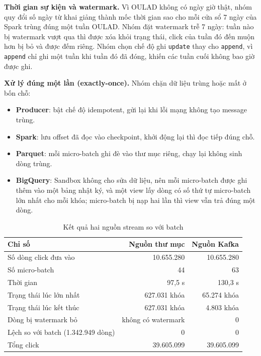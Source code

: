 \textbf{Thời gian sự kiện và watermark.} Vì OULAD không có ngày giờ thật, nhóm quy đổi số ngày từ khai giảng thành mốc thời gian sao cho mỗi cửa sổ 7 ngày của Spark trùng đúng một tuần OULAD. Nhóm đặt watermark trễ 7 ngày: tuần nào bị watermark vượt qua thì được xóa khỏi trạng thái, click của tuần đó đến muộn hơn bị bỏ và được đếm riêng. Nhóm chọn chế độ ghi \texttt{update} thay cho \texttt{append}, vì \texttt{append} chỉ ghi một tuần khi tuần đó đã đóng, khiến các tuần cuối không bao giờ được ghi.

\textbf{Xử lý đúng một lần (exactly-once).} Nhóm chặn dữ liệu trùng hoặc mất ở bốn chỗ:
\begin{itemize}
  \item \textbf{Producer}: bật chế độ idempotent, gửi lại khi lỗi mạng không tạo message trùng.
  \item \textbf{Spark}: lưu offset đã đọc vào checkpoint, khởi động lại thì đọc tiếp đúng chỗ.
  \item \textbf{Parquet}: mỗi micro-batch ghi đè vào thư mục riêng, chạy lại không sinh dòng trùng.
  \item \textbf{BigQuery}: Sandbox không cho sửa dữ liệu, nên mỗi micro-batch được ghi thêm vào
        một bảng nhật ký, và một view lấy dòng có số thứ tự micro-batch lớn nhất cho mỗi khóa;
        micro-batch bị nạp hai lần thì view vẫn trả đúng một dòng.
\end{itemize}

\newpage

\begin{table}[htbp]
\centering
\small
\begin{tabular}{|l|r|r|}
\hline
\textbf{Chỉ số} & \textbf{Nguồn thư mục} & \textbf{Nguồn Kafka} \\ \hline
Số dòng click đưa vào & 10.655.280 & 10.655.280 \\ \hline
Số micro-batch & 44 & 63 \\ \hline
Thời gian & 97,5 s & 130,3 s \\ \hline
Trạng thái lúc lớn nhất & 627.031 khóa & 65.274 khóa \\ \hline
Trạng thái lúc kết thúc & 627.031 khóa & 4.803 khóa \\ \hline
Dòng bị watermark bỏ & không có watermark & 0 \\ \hline
Lệch so với batch (1.342.949 dòng) & 0 & 0 \\ \hline
Tổng click & 39.605.099 & 39.605.099 \\ \hline
\end{tabular}
\caption{Kết quả hai nguồn stream so với batch}
\label{tab:stream-ket-qua}
\end{table}

